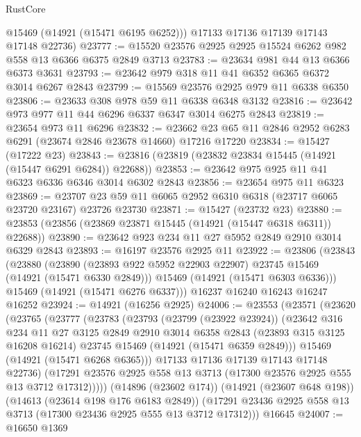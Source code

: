 \begin{lexlean}{RustCore}
\begin{coremodule}
        @15469
        (@14921 (@15471 @6195 @6252)))
      @17133
      @17136
      @17139
      @17143
      @17148
      @22736)
@23777 := @15520 @23576 @2925 @2925 @15524 @6262 @982 @558 @13 @6366 @6375 @2849 @3713
@23783 := @23634 @981 @44 @13 @6366 @6373 @3631
@23793 := @23642 @979 @318 @11 @41 @6352 @6365 @6372 @3014 @6267 @2843
@23799 := @15569 @23576 @2925 @979 @11 @6338 @6350
@23806 := @23633 @308 @978 @59 @11 @6338 @6348 @3132
@23816 := @23642 @973 @977 @11 @44 @6296 @6337 @6347 @3014 @6275 @2843
@23819 := @23654 @973 @11 @6296
@23832 := @23662 @23 @65 @11 @2846 @2952 @6283 @6291 (@23674 @2846 @23678 @14660) @17216 @17220
@23834 := @15427 (@17222 @23)
@23843 := @23816 (@23819 (@23832 @23834 @15445 (@14921 (@15447 @6291 @6284)) @22688))
@23853 := @23642 @975 @925 @11 @41 @6323 @6336 @6346 @3014 @6302 @2843
@23856 := @23654 @975 @11 @6323
@23869 := @23707 @23 @59 @11 @6065 @2952 @6310 @6318 (@23717 @6065 @23720 @23167) @23726 @23730
@23871 := @15427 (@23732 @23)
@23880 := @23853 (@23856 (@23869 @23871 @15445 (@14921 (@15447 @6318 @6311)) @22688))
@23890 := @23642 @923 @234 @11 @27 @5952 @2849 @2910 @3014 @6329 @2843
@23893 := @16197 @23576 @2925 @11
@23922 := @23806
    (@23843
      (@23880
        (@23890 (@23893 @922 @5952 @22903 @22907) @23745 @15469 (@14921 (@15471 @6330 @2849)))
        @15469
        (@14921 (@15471 @6303 @6336)))
      @15469
      (@14921 (@15471 @6276 @6337)))
    @16237
    @16240
    @16243
    @16247
    @16252
@23924 := @14921 (@16256 @2925)
@24006 := @23553
    (@23571
      (@23620
        (@23765
          (@23777
            (@23783
              (@23793
                (@23799 (@23922 @23924))
                (@23642
                  @316
                  @234
                  @11
                  @27
                  @3125
                  @2849
                  @2910
                  @3014
                  @6358
                  @2843
                  (@23893 @315 @3125 @16208 @16214)
                  @23745
                  @15469
                  (@14921 (@15471 @6359 @2849)))
                @15469
                (@14921 (@15471 @6268 @6365)))
              @17133
              @17136
              @17139
              @17143
              @17148
              @22736)
            (@17291 @23576 @2925 @558 @13 @3713 (@17300 @23576 @2925 @555 @13 @3712 @17312)))))
      (@14896 (@23602 @174))
      (@14921 (@23607 @648 @198))
      (@14613 (@23614 @198 @176 @6183 @2849))
      (@17291 @23436 @2925 @558 @13 @3713 (@17300 @23436 @2925 @555 @13 @3712 @17312)))
    @16645
@24007 := @16650 @1369

\end{coremodule}
\end{lexlean}
